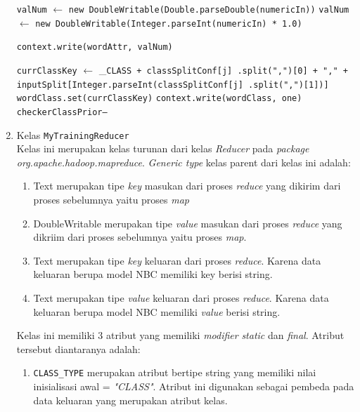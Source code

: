 \begin{enumerate}
\begin{algorithm}[H]
\begin{algorithmic}[1]
          		\State \texttt{valNum} $\gets$ \texttt{new DoubleWritable(Double.parseDouble(numericIn))}
          	\Else
          		\State \texttt{valNum} $\gets$  \texttt{new DoubleWritable(Integer.parseInt(numericIn) * 1.0)}
          	\EndIf
			
		  	\State \texttt{context.write(wordAttr, valNum)}
			
          		\State \texttt{currClassKey} $\gets$ \_\texttt{CLASS + classSplitConf[j] .split(",")[0] + "," + inputSplit[Integer.parseInt(classSplitConf[j] .split(",")[1])]}
          		\State \texttt{wordClass.set(currClassKey)}
          		\State \texttt{context.write(wordClass, one)}
          		\State \texttt{checkerClassPrior--}
          	\EndIf
			
		\EndFor
	\EndIf
\EndFor

\EndProcedure
\end{algorithmic}
\end{algorithm}
	
	\item{Kelas \texttt{MyTrainingReducer}}\\
	Kelas ini merupakan kelas turunan dari kelas \textit{Reducer} pada \textit{package org.apache.hadoop.mapreduce}. \textit{Generic type} kelas parent dari kelas ini adalah: 
	\begin{enumerate}
		\item Text merupakan tipe \textit{key} masukan dari proses \textit{reduce} yang dikirim dari proses sebelumnya yaitu proses \textit{map}
		\item DoubleWritable merupakan tipe \textit{value} masukan dari proses \textit{reduce} yang dikriim dari proses sebelumnya yaitu proses \textit{map}.
		\item Text merupakan tipe \textit{key} keluaran dari proses \textit{reduce}. Karena data keluaran berupa model NBC memiliki key berisi string.
		\item Text merupakan tipe \textit{value} keluaran dari proses \textit{reduce}. Karena data keluaran berupa model NBC memiliki \textit{value} berisi string.
	\end{enumerate}
	Kelas ini memiliki 3 atribut yang memiliki \textit{modifier} \textit{static} dan \textit{final}. Atribut tersebut diantaranya adalah:
	\begin{enumerate}
		\item \verb|CLASS_TYPE| merupakan atribut bertipe string yang memiliki nilai inisialisasi awal = \textit{"CLASS"}. Atribut ini digunakan sebagai pembeda pada data keluaran yang merupakan atribut kelas.
				

\end{enumerate}
\end{enumerate}
